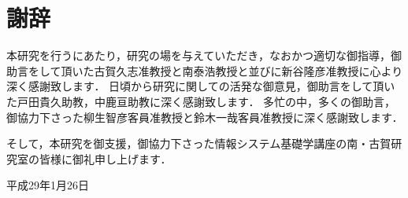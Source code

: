 \chapter*{\huge 謝辞}
本研究を行うにあたり，研究の場を与えていただき，なおかつ適切な御指導，御助言をして頂いた古賀久志准教授と南泰浩教授と並びに新谷隆彦准教授に心より深く感謝致します．
日頃から研究に関しての活発な御意見，御助言をして頂いた戸田貴久助教，中鹿亘助教に深く感謝致します．
多忙の中，多くの御助言，御協力下さった柳生智彦客員准教授と鈴木一哉客員准教授に深く感謝致します．

そして，本研究を御支援，御協力下さった情報システム基礎学講座の南・古賀研究室の皆様に御礼申し上げます．

\vspace{2cm}

\hspace*{\fill}平成29年1月26日\\
\hspace*{\fill}{}